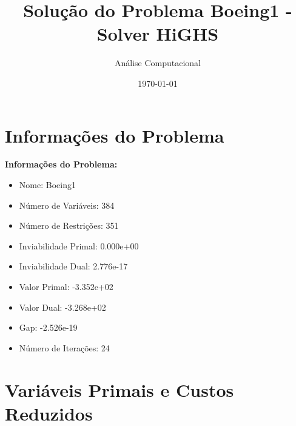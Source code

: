\documentclass[12pt]{article}
\title{Solução do Problema Boeing1 - Solver HiGHS}
\author{Análise Computacional}
\date{\today}
\begin{document}
\maketitle

\section{Informações do Problema}

\textbf{Informações do Problema:}
\begin{itemize}
\item Nome: Boeing1
\item Número de Variáveis: 384
\item Número de Restrições: 351
\item Inviabilidade Primal: 0.000e+00
\item Inviabilidade Dual: 2.776e-17
\item Valor Primal: -3.352e+02
\item Valor Dual: -3.268e+02
\item Gap: -2.526e-19
\item Número de Iterações: 24
\end{itemize}


\section{Variáveis Primais e Custos Reduzidos}
\end{document}
